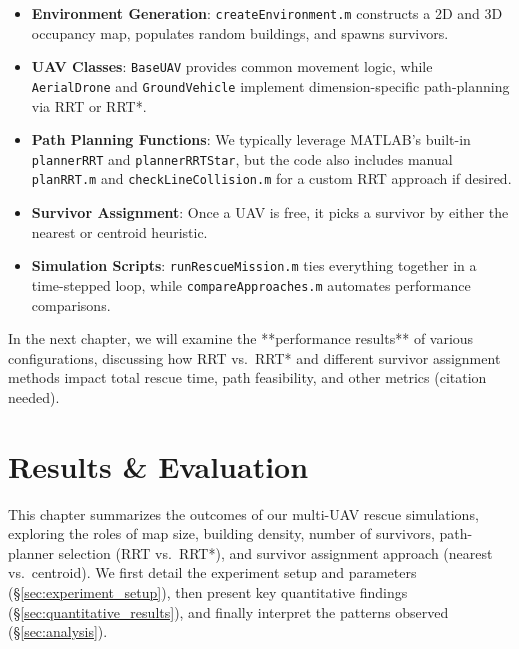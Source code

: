 \documentclass[12pt,a4paper]{report}
\begin{document}
\begin{itemize}
    \item \textbf{Environment Generation}: \texttt{createEnvironment.m} constructs a 
          2D and 3D occupancy map, populates random buildings, and spawns survivors.
    \item \textbf{UAV Classes}: \texttt{BaseUAV} provides common movement logic, while 
          \texttt{AerialDrone} and \texttt{GroundVehicle} implement dimension-specific 
          path-planning via RRT or RRT*.
    \item \textbf{Path Planning Functions}: We typically leverage MATLAB’s built-in 
          \texttt{plannerRRT} and \texttt{plannerRRTStar}, but the code also includes 
          manual \texttt{planRRT.m} and \texttt{checkLineCollision.m} for a custom 
          RRT approach if desired.
    \item \textbf{Survivor Assignment}: Once a UAV is free, it picks a survivor 
          by either the nearest or centroid heuristic.
    \item \textbf{Simulation Scripts}: \texttt{runRescueMission.m} ties everything 
          together in a time-stepped loop, while \texttt{compareApproaches.m} 
          automates performance comparisons.
\end{itemize}

In the next chapter, we will examine the **performance results** of various configurations, 
discussing how RRT vs.\ RRT* and different survivor assignment methods impact total 
rescue time, path feasibility, and other metrics (citation needed).

\chapter{Results \& Evaluation}
\label{ch:results}

This chapter summarizes the outcomes of our multi-UAV rescue simulations, exploring
the roles of map size, building density, number of survivors, path-planner selection
(RRT vs.\ RRT*), and survivor assignment approach (nearest vs.\ centroid). We first
detail the experiment setup and parameters (\S\ref{sec:experiment_setup}), then present
key quantitative findings (\S\ref{sec:quantitative_results}), and finally interpret the
patterns observed (\S\ref{sec:analysis}).

\end{document}
